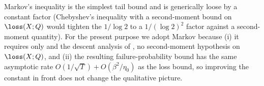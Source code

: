 \begin{remark}\label{rem:markov_tightness}
Markov's inequality is the simplest tail bound and is generically loose
by a constant factor (Chebyshev's inequality with a second-moment bound
on $\loss(X; Q)$ would tighten the $1/\log 2$ to a $1/(\log 2)^2$ factor
against a second-moment quantity). For the present purpose we adopt
Markov because (i) it requires only  and the
descent analysis of , no second-moment hypothesis
on $\loss(X; Q)$, and (ii) the resulting failure-probability bound
 has the same asymptotic rate
$O(1/\sqrt T) + O(\beta^2/\eta_0)$ as the loss bound, so improving the
constant in front does not change the qualitative picture.
\end{remark}
